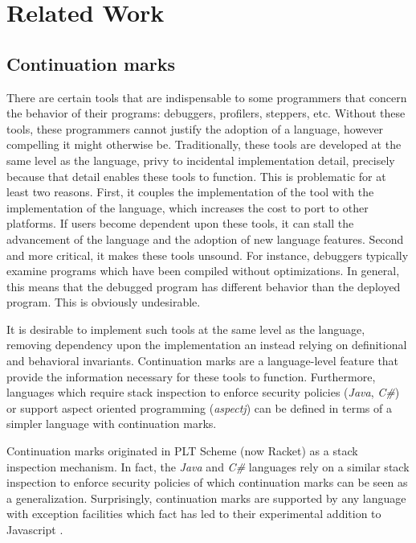 \documentclass[ms]{byuprop}
\newcounter{definition}
\begin{document}
\section{Related Work}

\subsection{Continuation marks}

There are certain tools that are indispensable to some programmers that concern the
behavior of their programs: debuggers, profilers, steppers, etc. Without these tools,
these programmers cannot justify the adoption of a language, however compelling it might
otherwise be. Traditionally, these tools are developed at the same level as the 
language, privy to incidental implementation detail, precisely because that detail 
enables these tools to function. This is problematic for at least two reasons. First, 
it couples the implementation of the tool with the implementation of the language, which
increases the cost to port to other platforms. If users become dependent upon these tools,
it can stall the advancement of the language and the adoption of new language features.
Second and more critical, it makes these tools unsound. For instance, debuggers typically
examine programs which have been compiled without optimizations. In general, this means 
that the debugged program has different behavior than the deployed program. This is 
obviously undesirable.

It is desirable to implement such tools at the same level as the language, removing
dependency upon the implementation an instead relying on definitional and behavioral
invariants. Continuation marks are a language-level feature that provide the information
necessary for these tools to function. Furthermore, languages which require stack
inspection to enforce security policies (\emph{Java}, \emph{C\#}) or support aspect
oriented programming (\emph{aspectj}) can be defined in terms of a simpler language with
continuation marks.

Continuation marks originated in PLT Scheme (now Racket) \cite{plt-tr1} as a stack 
inspection mechanism. In fact, the \emph{Java} and \emph{C\#} languages rely on a similar 
stack inspection to enforce security policies of which continuation marks can be seen as 
a generalization. Surprisingly, continuation marks are supported by any language with 
exception facilities \cite{pettyjohn2005continuations} which fact has led to their 
experimental addition to Javascript \cite{clements2008implementing}.
\end{document}

